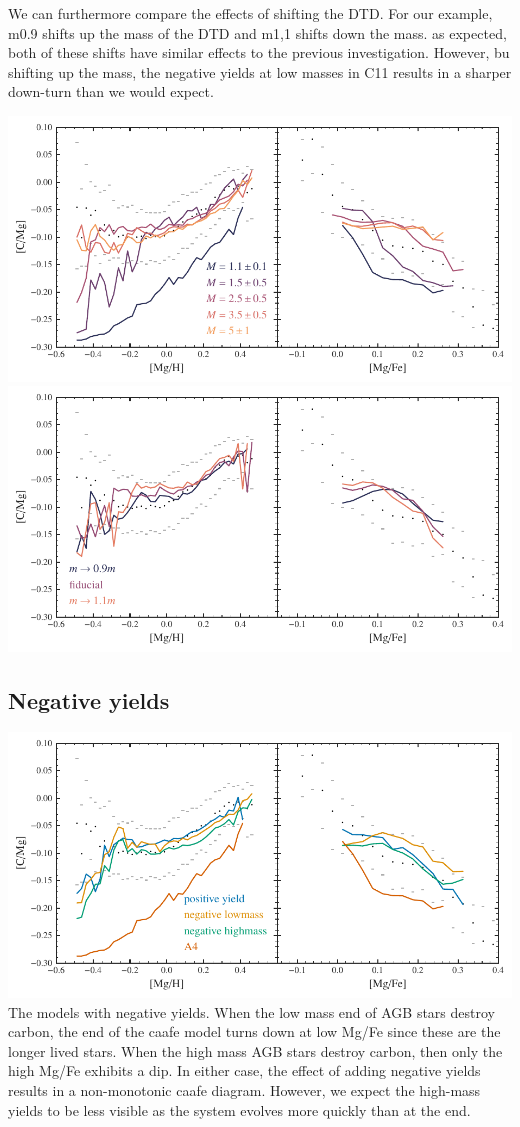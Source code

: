 We can furthermore compare the effects of shifting the DTD. For our
example, m0.9 shifts up the mass of the DTD and m1,1 shifts down the
mass. as expected, both of these shifts have similar effects to the
previous investigation. However, bu shifting up the mass, the negative
yields at low masses in C11 results in a sharper down-turn than we would
expect.

\includegraphics{figures/agb_mass.pdf}
\includegraphics{figures/shift_mass.pdf}

\hypertarget{negative-yields}{%
\subsection{Negative yields}\label{negative-yields}}

\includegraphics{figures/negative_yields.pdf} The models with negative
yields. When the low mass end of AGB stars destroy carbon, the end of
the caafe model turns down at low Mg/Fe since these are the longer lived
stars. When the high mass AGB stars destroy carbon, then only the high
Mg/Fe exhibits a dip. In either case, the effect of adding negative
yields results in a non-monotonic caafe diagram. However, we expect the
high-mass yields to be less visible as the system evolves more quickly
than at the end.

